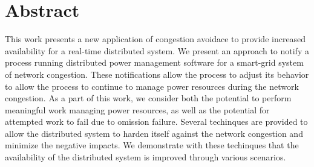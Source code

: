 \section{Abstract}

This work presents a new application of congestion avoidace to provide increased availability for a real-time distributed system.
We present an approach to notify a process running distributed power management software for a smart-grid system of network congestion.
These notifications allow the process to adjust its behavior to allow the process to continue to manage power resources during the network congestion.
As a part of this work, we consider both the potential to perform meaningful work managing power resources, as well as the potential for attempted work to fail due to omission failure.
Several techinques are provided to allow the distributed system to harden itself against the network congestion and minimize the negative impacts.
We demonstrate with these techinques that the availability of the distributed system is improved through various scenarios.
